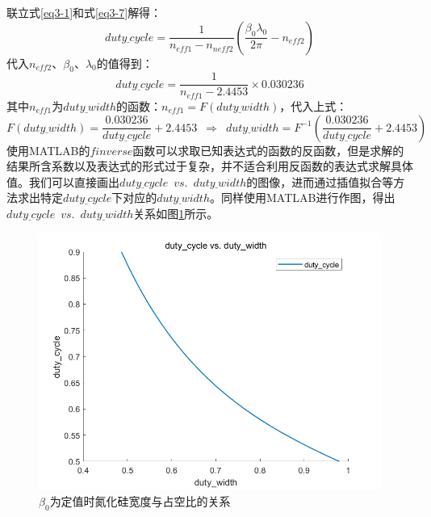 \documentclass[UTF8,a4paper,12pt]{ctexart}
\numberwithin{equation}{section}
\begin{document}
联立式\ref{eq3-1}和式\ref{eq3-7}解得：
\begin{equation}
    duty\underline{~}cycle = \frac{1}{n_{eff1}-n_{neff2}}\left( \frac{\beta_0\lambda_0}{2\pi}-n_{eff2} \right)
    \label{eq3-9}
\end{equation}
代入$n_{eff2}$、$\beta_0$、$\lambda_0$的值得到：
$$duty\underline{~}cycle = \frac{1}{n_{eff1}-2.4453}\times 0.030236$$
其中$n_{eff1}$为$duty\underline{~}width$的函数：$n_{eff1}=F(duty\underline{~}width)$，代入上式：
\begin{equation}
    F(duty\underline{~}width)=\frac{0.030236}{duty\underline{~}cycle}+2.4453\enspace \Rightarrow\enspace  duty\underline{~}width = F^{-1}\left(\frac{0.030236}{duty\underline{~}cycle}+2.4453\right)
    \label{eq3-10}
\end{equation}
使用MATLAB的$finverse$函数可以求取已知表达式的函数的反函数，但是求解的结果所含系数以及表达式的形式过于复杂，并不适合利用反函数的表达式求解具体值。我们可以直接画出$duty\underline{~}cycle \enspace vs. \enspace  duty\underline{~}width$的图像，进而通过插值拟合等方法求出特定$duty\underline{~}cycle$下对应的$duty\underline{~}width$。同样使用MATLAB进行作图，得出$duty\underline{~}cycle \enspace vs. \enspace  duty\underline{~}width$关系如图\ref{3-21}所示。
\begin{figure}[htbp]
\centering
\includegraphics[width=0.8\linewidth]{fig25.png}
\caption{$\beta_0$为定值时氮化硅宽度与占空比的关系}
\label{3-21}
\end{figure}
\end{document}
